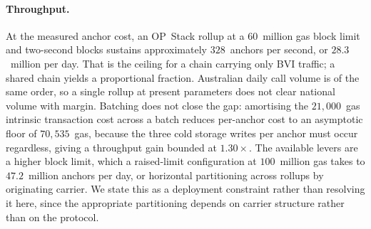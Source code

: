 
\paragraph{Throughput.}
At the measured anchor cost, an OP~Stack rollup at a $60$~million gas block
limit and two-second blocks sustains approximately $328$~anchors per second, or
$28.3$~million per day. That is the ceiling for a chain carrying only BVI
traffic; a shared chain yields a proportional fraction. Australian daily call
volume is of the same order, so a single rollup at present parameters does not
clear national volume with margin. Batching does not close the gap: amortising
the $21{,}000$~gas intrinsic transaction cost across a batch reduces per-anchor
cost to an asymptotic floor of $70{,}535$~gas, because the three cold storage
writes per anchor must occur regardless, giving a throughput gain bounded at
$1.30\times$. The available levers are a higher block limit, which a
raised-limit configuration at $100$~million gas takes to $47.2$~million anchors
per day, or horizontal partitioning across rollups by originating carrier.
We state this as a deployment constraint rather than resolving it here, since
the appropriate partitioning depends on carrier structure rather than on the
protocol.
